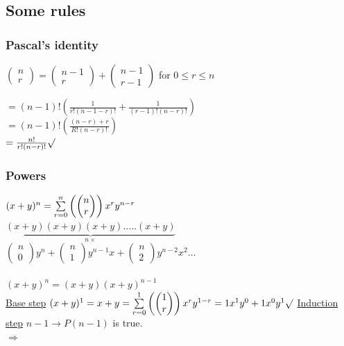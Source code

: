 \documentclass[12pt,a4paper]{article}
\begin{document}
\subsection{Some rules}
\subsubsection{Pascal's identity}
\begin{boiteV}{0.65}
$\begin{pmatrix}
n\\
r
\end{pmatrix}
=
\begin{pmatrix}
n-1\\
r
\end{pmatrix}
+
\begin{pmatrix}
n-1\\
r-1
\end{pmatrix}$ for $0 \leq r \leq n$
\end{boiteV}
$= (n-1)!\left(\frac{1}{r!(n-1-r)!}+\frac{1}{(r-1)!(n-r)!}\right)$\\
$= (n-1)!\left(\frac{(n-r)+r}{R!(n-r)!}\right)$\\
$ = \frac{n!}{r!(n-r)!} \surd$

\subsubsection{Powers}
$(x+y)^n = \somme{n}{r=0}{\begin{pmatrix}
	n\\
	r
\end{pmatrix}}
x^ry^{n-r}$\\
$\underbrace{(x+y)(x+y)(x+y).....(x+y)}_{n \times}$\\
$\begin{pmatrix}
	n\\
	0
\end{pmatrix}
y^n + 
\begin{pmatrix}
	n\\
	1
\end{pmatrix}
y^{n-1}x + 
\begin{pmatrix}
	n\\
	2
\end{pmatrix}
y^{n-2}x^2\ldots$\\
\\
$(x+y)^n = (x+y)(x+y)^{n-1}$\\
\underline{Base step} $(x+y)^1 = x+y = \somme{1}{r=0}{\begin{pmatrix}
	1\\
	r
\end{pmatrix}}
x^ry^{1-r} = 1x^1y^0 + 1x^0y^1 \surd$
\underline{Induction step} $n-1 \to P(n-1)$ is true. \\
$\Rightarrow $
\end{document}
